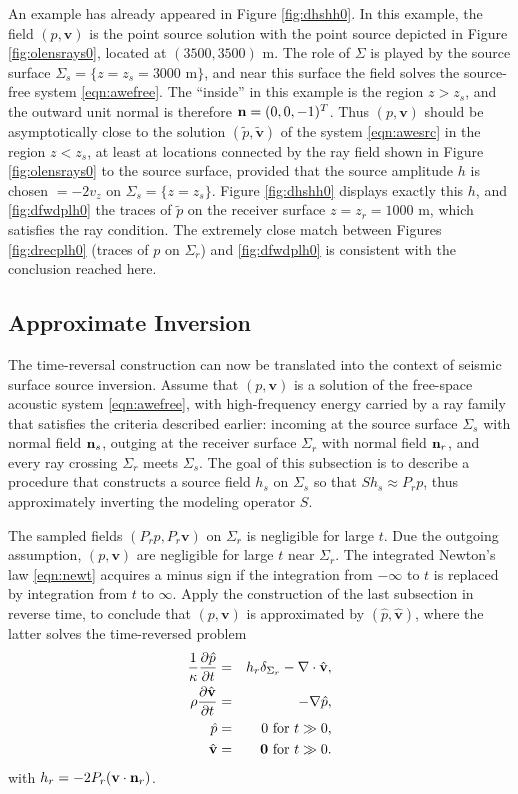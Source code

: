 \documentclass[12pt]{geophysics}
\newcommand{\bv}{\mathbf{v}}
\begin{document}
An example has already appeared in Figure \ref{fig:dhshh0}. In this
example, the field $(p, \bv)$ is the point source solution with the
point source depicted in Figure \ref{fig:olensrays0}, located at
$(3500, 3500)$ m. The role of $\Sigma$ is played by the source surface $\Sigma_s=
\{z=z_s=3000 \mbox{ m}\}$, and near this surface the field solves the source-free
system \ref{eqn:awefree}. The ``inside'' in this example is the region
$z > z_s$, and the outward unit normal is therefore ${\bf n}=(0,0,-1)^T$.
Thus $(p,\bv)$ should be asymptotically close to the solution
$(\tilde{p},\tilde{\bv})$ of the
system \ref{eqn:awesrc} in the region $z< z_s$, at least at locations
connected by the ray field shown in Figure \ref{fig:olensrays0} to the
source surface, provided that the source amplitude $h$ is chosen $=
-2v_z$ on $\Sigma_s=\{z=z_s\}$. Figure \ref{fig:dhshh0} displays exactly this $h$, and
\ref{fig:dfwdplh0} the traces of $\tilde{p}$ on the
  receiver surface $z=z_r=1000$ m, which satisfies the ray condition. The extremely
close match between Figures \ref{fig:drecplh0} (traces of $p$ on $\Sigma_r$) and
\ref{fig:dfwdplh0} is consistent with the conclusion reached here.

\subsection{Approximate Inversion}

The time-reversal construction can now be translated into the context
of seismic surface source inversion. Assume that $(p,\bv)$ is a
solution of the free-space acoustic system \ref{eqn:awefree}, with
high-frequency energy carried by a ray family that satisfies the
criteria described earlier: incoming at the source surface $\Sigma_s$
with normal field ${\bf n}_s$, outging at the receiver surface
$\Sigma_r$ with normal field ${\bf n}_r$, and every ray crossing
$\Sigma_r$ meets $\Sigma_s$. The goal of this subsection is to
describe a procedure that constructs a source field $h_s$ on
$\Sigma_s$ so that $Sh_s \approx P_rp$, thus approximately inverting
the modeling operator $S$.

The sampled fields $(P_rp,P_r\bv)$ on $\Sigma_r$
is negligible for large $t$. Due the outgoing assumption,
$(p,\bv)$ are negligible for large $t$ near $\Sigma_r$. The
integrated Newton's law \ref{eqn:newt} acquires a minus sign if the
integration from $-\infty$ to $t$ is replaced by integration from $t$
to $\infty$. Apply the construction of the last subsection in reverse
time, to conclude
that $(p,\bv)$ is approximated by $(\hat{p},\hat{\bv})$, where the
latter solves the time-reversed problem
\begin{eqnarray}
\label{eqn:awerecglob}
  \frac{1}{\kappa}\frac{\partial\hat{p}}{\partial t} & = & h_r \delta_{\Sigma_r}
                                                      - \nabla \cdot \hat{\bv}, \nonumber \\
  \rho\frac{\partial \hat{\bv}}{\partial t} & = & - \nabla \hat{p}, \nonumber \\
  \hat{p} & = & 0 \mbox{ for } t\gg 0, \nonumber \\
  \hat{\bv} & = & {\bf 0} \mbox{ for } t \gg 0.       
\end{eqnarray}
with $h_r = -2P_r(\bv \cdot {\bf n}_r)$.
\end{document}
